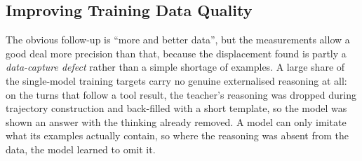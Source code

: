 \subsection{Improving Training Data Quality}
\label{subsec:conclusion-future-data}

The obvious follow-up is ``more and better data'', but the measurements allow a good deal more precision than that, because the displacement found is partly a \emph{data-capture defect} rather than a simple shortage of examples. A large share of the single-model training targets carry no genuine externalised reasoning at all: on the turns that follow a tool result, the teacher's reasoning was dropped during trajectory construction and back-filled with a short template, so the model was shown an answer with the thinking already removed. A model can only imitate what its examples actually contain, so where the reasoning was absent from the data, the model learned to omit it.


